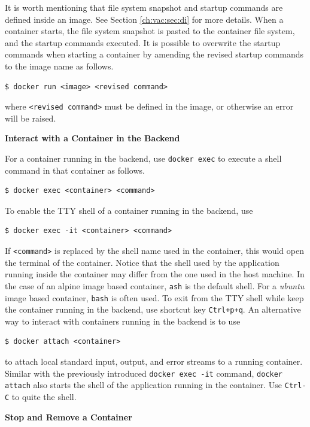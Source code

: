 It is worth mentioning that file system snapshot and startup commands are defined inside an image. See Section \ref{ch:vac:sec:di} for more details. When a container starts, the file system snapshot is pasted to the container file system, and the startup commands executed. It is possible to overwrite the startup commands when starting a container by amending the revised startup commands to the image name as follows.
\begin{lstlisting}
$ docker run <image> <revised command>
\end{lstlisting}
where \verb|<revised command>| must be defined in the image, or otherwise an error will be raised.

\vspace{0.1in}
\noindent \textbf{Interact with a Container in the Backend}
\vspace{0.1in}

For a container running in the backend, use \verb|docker exec| to execute a shell command in that container as follows.
\begin{lstlisting}
$ docker exec <container> <command>
\end{lstlisting}
To enable the TTY shell of a container running in the backend, use
\begin{lstlisting}
$ docker exec -it <container> <command>
\end{lstlisting}
If \verb|<command>| is replaced by the shell name used in the container, this would open the terminal of the container. Notice that the shell used by the application running inside the container may differ from the one used in the host machine. In the case of an alpine image based container, \verb|ash| is the default shell. For a \textit{ubuntu} image based container, \verb|bash| is often used. To exit from the TTY shell while keep the container running in the backend, use shortcut key \verb|Ctrl+p+q|. An alternative way to interact with containers running in the backend is to use
\begin{lstlisting}
$ docker attach <container>
\end{lstlisting}
to attach local standard input, output, and error streams to a running container. Similar with the previously introduced \texttt{docker exec -it} command, \texttt{docker attach} also starts the shell of the application running in the container. Use \verb|Ctrl-C| to quite the shell.

\vspace{0.1in}
\noindent \textbf{Stop and Remove a Container}
\vspace{0.1in}

